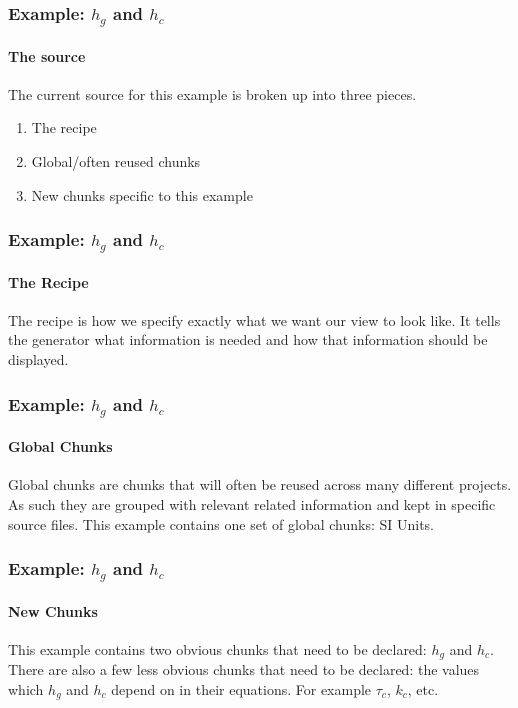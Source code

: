 \documentclass{beamer}
\begin{document}

\begin{frame}

\frametitle{Example: $h_g$ and $h_c$}

\framesubtitle{The source}

The current source for this example is broken up into three pieces.
\begin{enumerate}
	\item The recipe %
	\item Global/often reused chunks %
	\item New chunks specific to this example %

\end{enumerate}
\end{frame}



\begin{frame}

\frametitle{Example: $h_g$ and $h_c$}

\framesubtitle{The Recipe}

The recipe is how we specify exactly what we want our view to look like.
\newline \newline
It tells the generator what information is needed and how that information
should be displayed.

\end{frame}


\begin{frame}
\frametitle{Example: $h_g$ and $h_c$}
\framesubtitle{Global Chunks}

Global chunks are chunks that will often be reused across many different projects.
As such they are grouped with relevant related information and kept in 
specific source files.
\newline \newline
This example contains one set of global chunks: SI Units.


\end{frame}


\begin{frame}

\frametitle{Example: $h_g$ and $h_c$}

\framesubtitle{New Chunks}

This example contains two obvious chunks that need to be declared:
$h_g$ and $h_c$.
\newline \newline
There are also a few less obvious chunks that need to be declared:
the values which $h_g$ and $h_c$ depend on in their equations. 
For example $\tau_c$, $k_c$, etc.


\end{frame}
\end{document}

